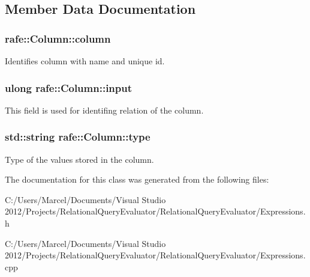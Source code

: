 \subsection{Member Data Documentation}
\hypertarget{classrafe_1_1_column_a7d991e6ad44729235c31910dcc885c5d}{
\subsubsection[{column}]{ rafe\+::\+Column\+::column}}\label{classrafe_1_1_column_a7d991e6ad44729235c31910dcc885c5d}
Identifies column with name and unique id. \hypertarget{classrafe_1_1_column_a1d4d38a6c74a83602c193c5a51f20780}{
\subsubsection[{input}]{\setlength{\rightskip}{0pt plus 5cm}ulong rafe\+::\+Column\+::input}}\label{classrafe_1_1_column_a1d4d38a6c74a83602c193c5a51f20780}
This field is used for identifing relation of the column. \hypertarget{classrafe_1_1_column_a3e812878630c51153a69f372b1472ce6}{
\subsubsection[{type}]{\setlength{\rightskip}{0pt plus 5cm}std\+::string rafe\+::\+Column\+::type}}\label{classrafe_1_1_column_a3e812878630c51153a69f372b1472ce6}
Type of the values stored in the column. 

The documentation for this class was generated from the following files\+:\begin{DoxyCompactItemize}
\item 
C\+:/\+Users/\+Marcel/\+Documents/\+Visual Studio 2012/\+Projects/\+Relational\+Query\+Evaluator/\+Relational\+Query\+Evaluator/Expressions.\+h\item 
C\+:/\+Users/\+Marcel/\+Documents/\+Visual Studio 2012/\+Projects/\+Relational\+Query\+Evaluator/\+Relational\+Query\+Evaluator/Expressions.\+cpp\end{DoxyCompactItemize}
